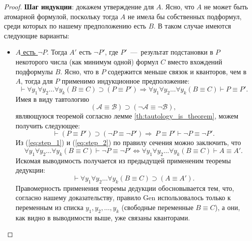\begin{proof}
    \textbf{Шаг индукции}: докажем утверждение для $A$. Ясно, что $A$ не может быть атомарной формулой, поскольку тогда $A$ не имела бы собственных подформул, среди которых по нашему предположению есть $B$. В таком случае имеются следующие варианты:
    \begin{itemize}
        \item \underline{$A$ есть $\neg P$}. Тогда $A'$ есть $\neg P'$, где $P'$~---~результат подстановки в $P$ некоторого числа (как минимум одной) формул $C$ вместо вхождений подформулы $B$. Ясно, что в $P$ содержится меньше связок и кванторов, чем в $A$, тогда для $P$ применимо индукционное предположение:
        \begin{equation}\label{eq:step_1}
            \vdash \forall y_1\forall y_2\dots\forall y_k(B \equiv C) \supset (P \equiv P') \Longrightarrow \forall y_1\forall y_2\dots\forall y_k(B \equiv C) \vdash P \equiv P'.
        \end{equation}
        Имея в виду тавтологию
        \[
            (\mathcal{A} \equiv \mathcal{B}) \supset (\neg \mathcal{A} \equiv \neg \mathcal{B}),
        \]
        являющуюся теоремой согласно лемме \ref{th:tautology_is_theorem}, можем получить следующее:
        \begin{equation}\label{eq:step_2}
            \vdash (P \equiv P') \supset (\neg P \equiv \neg P') \Longrightarrow\ P \equiv P' \vdash \neg P \equiv \neg P'.
        \end{equation}
        Из (\ref{eq:step_1}) и (\ref{eq:step_2}) по правилу сечения можно заключить, что
        \[
            \forall y_1\forall y_2\dots\forall y_k(B \equiv C) \vdash \neg P \equiv \neg P' \Longleftrightarrow \forall y_1\forall y_2\dots\forall y_k(B \equiv C) \vdash A \equiv A'.
        \]
        Искомая выводимость получается из предыдущей примененим теоремы дедукции:
        \[
            \vdash \forall y_1\forall y_2\dots\forall y_k(B \equiv C) \supset (A \equiv A').
        \]
        Правомерность применения теоремы дедукции обосновывается тем, что, согласно нашему доказательству, правило Gen использовалось только к переменным из списка $y_1, y_2, \dots, y_k$ (свободные переменные $B \equiv C$), а они, как видно в выводимости выше, уже связаны кванторами.


\end{itemize}
\end{proof}
